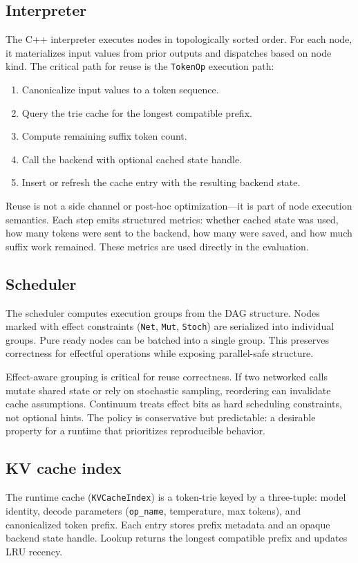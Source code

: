 \documentclass[10pt,twocolumn]{article}
\begin{document}
\subsection{Interpreter}
The C++ interpreter executes nodes in topologically sorted order. For each node, it materializes input values from prior outputs and dispatches based on node kind. The critical path for reuse is the \texttt{TokenOp} execution path:
\begin{enumerate}[leftmargin=*]
  \item Canonicalize input values to a token sequence.
  \item Query the trie cache for the longest compatible prefix.
  \item Compute remaining suffix token count.
  \item Call the backend with optional cached state handle.
  \item Insert or refresh the cache entry with the resulting backend state.
\end{enumerate}

Reuse is not a side channel or post-hoc optimization---it is part of node execution semantics. Each step emits structured metrics: whether cached state was used, how many tokens were sent to the backend, how many were saved, and how much suffix work remained. These metrics are used directly in the evaluation.

\subsection{Scheduler}
The scheduler computes execution groups from the DAG structure. Nodes marked with effect constraints (\texttt{Net}, \texttt{Mut}, \texttt{Stoch}) are serialized into individual groups. Pure ready nodes can be batched into a single group. This preserves correctness for effectful operations while exposing parallel-safe structure.

Effect-aware grouping is critical for reuse correctness. If two networked calls mutate shared state or rely on stochastic sampling, reordering can invalidate cache assumptions. Continuum treats effect bits as hard scheduling constraints, not optional hints. The policy is conservative but predictable: a desirable property for a runtime that prioritizes reproducible behavior.

\subsection{KV cache index}
The runtime cache (\texttt{KVCacheIndex}) is a token-trie keyed by a three-tuple: model identity, decode parameters (\texttt{op\_name}, temperature, max tokens), and canonicalized token prefix. Each entry stores prefix metadata and an opaque backend state handle. Lookup returns the longest compatible prefix and updates LRU recency.
\end{document}
